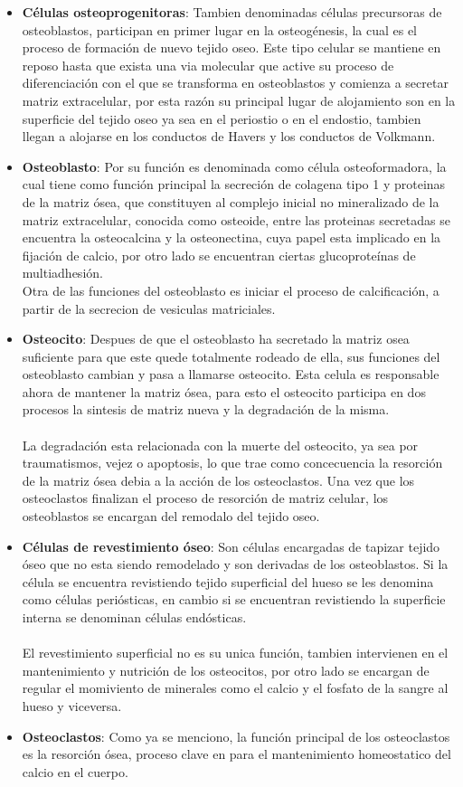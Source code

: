 \documentclass[letterpaper,12pt,oneside]{book}
\begin{document}
    \begin{itemize}
        \item \textbf{Células osteoprogenitoras}: Tambien denominadas células precursoras de osteoblastos, participan en primer lugar en la osteogénesis, la cual es el proceso de formación de nuevo tejido oseo. Este tipo celular se mantiene en reposo hasta que exista una via molecular que active su proceso de diferenciación con el que se transforma en osteoblastos y comienza a secretar matriz extracelular, por esta razón su principal lugar de alojamiento son en la superficie del tejido oseo ya sea en el periostio o en el endostio, tambien llegan a alojarse en los conductos de Havers y los conductos de Volkmann. 
        \item \textbf{Osteoblasto}: Por su función es denominada como célula osteoformadora, la cual tiene como función principal la secreción de colagena tipo 1 y proteinas de la matriz ósea, que constituyen al complejo inicial no mineralizado de la matriz extracelular, conocida como osteoide, entre las proteinas secretadas se encuentra la osteocalcina y la osteonectina, cuya papel esta implicado en la fijación de calcio, por otro lado se encuentran ciertas glucoproteínas de multiadhesión. \\ Otra de las funciones del osteoblasto es iniciar el proceso de calcificación, a partir de la secrecion de vesiculas matriciales.
        \item \textbf{Osteocito}: Despues de que el osteoblasto ha secretado la matriz osea suficiente para que este quede totalmente rodeado de ella, sus funciones del osteoblasto cambian y pasa a llamarse osteocito. Esta celula es responsable ahora de mantener la matriz ósea, para esto el osteocito participa en dos procesos la sintesis de matriz nueva y la degradación de la misma. \\ \\ La degradación esta relacionada con la muerte del osteocito, ya sea por traumatismos, vejez o apoptosis, lo que trae como concecuencia la resorción de la matriz ósea debia a la acción de los osteoclastos. Una vez que los osteoclastos finalizan el proceso de resorción de matriz celular, los osteoblastos se encargan del remodalo del tejido oseo. 
        \item \textbf{Células de revestimiento óseo}: Son células encargadas de tapizar tejido óseo que no esta siendo remodelado y son derivadas de los osteoblastos. Si la célula se encuentra revistiendo tejido superficial del hueso se les denomina como células periósticas, en cambio si se encuentran revistiendo la superficie interna se denominan células endósticas. \\ \\ El revestimiento superficial no es su unica función, tambien intervienen en el mantenimiento y nutrición de los osteocitos, por otro lado se encargan de regular el momiviento de minerales como el calcio y el fosfato de la sangre al hueso y viceversa. 
        \item \textbf{Osteoclastos}: Como ya se menciono, la función principal de los osteoclastos es la resorción ósea, proceso clave en para el mantenimiento homeostatico del calcio en el cuerpo. 
    \end{itemize}
\end{document}
